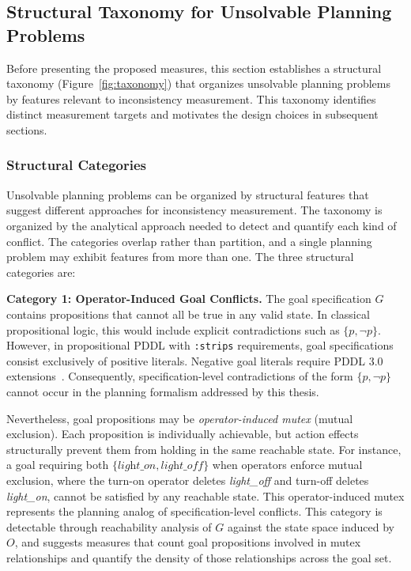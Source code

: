 \subsection{Structural Taxonomy for Unsolvable Planning Problems}
\label{sec:taxonomy}

Before presenting the proposed measures, this section establishes a structural taxonomy (Figure~\ref{fig:taxonomy}) that organizes unsolvable planning problems by features relevant to inconsistency measurement. This taxonomy identifies distinct measurement targets and motivates the design choices in subsequent sections.



\subsubsection{Structural Categories}

Unsolvable planning problems can be organized by structural features that suggest different approaches for inconsistency measurement. The taxonomy is organized by the analytical approach needed to detect and quantify each kind of conflict. The categories overlap rather than partition, and a single planning problem may exhibit features from more than one. The three structural categories are:

\textbf{Category 1: Operator-Induced Goal Conflicts.} The goal specification $G$ contains propositions that cannot all be true in any valid state. In classical propositional logic, this would include explicit contradictions such as $\{p, \neg p\}$. However, in propositional \ac{PDDL} with \texttt{:strips} requirements, goal specifications consist exclusively of positive literals. Negative goal literals require \ac{PDDL} 3.0 extensions~\cite{Gerevini2005}. Consequently, specification-level contradictions of the form $\{p, \neg p\}$ cannot occur in the planning formalism addressed by this thesis.

Nevertheless, goal propositions may be \emph{operator-induced mutex} (mutual exclusion). Each proposition is individually achievable, but action effects structurally prevent them from holding in the same reachable state. For instance, a goal requiring both $\{\textit{light\_on}, \textit{light\_off}\}$ when operators enforce mutual exclusion, where the turn-on operator deletes \textit{light\_off} and turn-off deletes \textit{light\_on}, cannot be satisfied by any reachable state. This operator-induced mutex represents the planning analog of specification-level conflicts. This category is detectable through reachability analysis of $G$ against the state space induced by $O$, and suggests measures that count goal propositions involved in mutex relationships and quantify the density of those relationships across the goal set.

